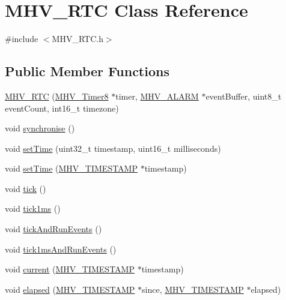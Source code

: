 \hypertarget{class_m_h_v___r_t_c}{
\section{\-M\-H\-V\-\_\-\-R\-T\-C \-Class \-Reference}
\label{class_m_h_v___r_t_c}
}


{\ttfamily \#include $<$\-M\-H\-V\-\_\-\-R\-T\-C.\-h$>$}

\subsection*{\-Public \-Member \-Functions}
\begin{DoxyCompactItemize}
\item 
\hyperlink{class_m_h_v___r_t_c_a6eb9e8d2ec831f69cdfbb65775893452}{\-M\-H\-V\-\_\-\-R\-T\-C} (\hyperlink{class_m_h_v___timer8}{\-M\-H\-V\-\_\-\-Timer8} $\ast$timer, \hyperlink{_m_h_v___r_t_c_8h_af13307658f41fba330ffae04dd5cbce6}{\-M\-H\-V\-\_\-\-A\-L\-A\-R\-M} $\ast$event\-Buffer, uint8\-\_\-t event\-Count, int16\-\_\-t timezone)
\item 
void \hyperlink{class_m_h_v___r_t_c_aa67e0d82c0ed27999d9154a7bf95e608}{synchronise} ()
\item 
void \hyperlink{class_m_h_v___r_t_c_a426e7a34e8a3957d378a634c2c2d00d8}{set\-Time} (uint32\-\_\-t timestamp, uint16\-\_\-t milliseconds)
\item 
void \hyperlink{class_m_h_v___r_t_c_a7e4f42af3581cce6261f1c83d1e2b0c1}{set\-Time} (\hyperlink{_m_h_v___r_t_c_8h_a1e30d3a92b1b868286bd0d619245d8a6}{\-M\-H\-V\-\_\-\-T\-I\-M\-E\-S\-T\-A\-M\-P} $\ast$timestamp)
\item 
void \hyperlink{class_m_h_v___r_t_c_af56442a6497ade702d8eb8ba935fb1ef}{tick} ()
\item 
void \hyperlink{class_m_h_v___r_t_c_a7149adf9da9e7209cd352eb67f40bf30}{tick1ms} ()
\item 
void \hyperlink{class_m_h_v___r_t_c_a7246016a7c37aefcdf2bb46f67bbb455}{tick\-And\-Run\-Events} ()
\item 
void \hyperlink{class_m_h_v___r_t_c_a1e0b5a223fb74c10a30f7712c42081e2}{tick1ms\-And\-Run\-Events} ()
\item 
void \hyperlink{class_m_h_v___r_t_c_aa4b7a93658ea4548520103f63d5897ec}{current} (\hyperlink{_m_h_v___r_t_c_8h_a1e30d3a92b1b868286bd0d619245d8a6}{\-M\-H\-V\-\_\-\-T\-I\-M\-E\-S\-T\-A\-M\-P} $\ast$timestamp)
\item 
void \hyperlink{class_m_h_v___r_t_c_a6bd66dbb9fd2229e3b229667e38adbf6}{elapsed} (\hyperlink{_m_h_v___r_t_c_8h_a1e30d3a92b1b868286bd0d619245d8a6}{\-M\-H\-V\-\_\-\-T\-I\-M\-E\-S\-T\-A\-M\-P} $\ast$since, \hyperlink{_m_h_v___r_t_c_8h_a1e30d3a92b1b868286bd0d619245d8a6}{\-M\-H\-V\-\_\-\-T\-I\-M\-E\-S\-T\-A\-M\-P} $\ast$elapsed)

\end{DoxyCompactItemize}
